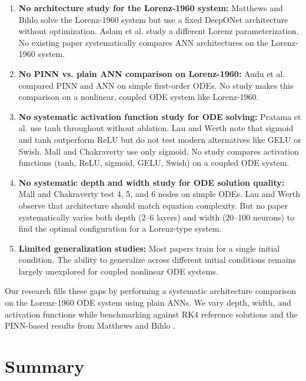 \begin{enumerate}
    \item \textbf{No architecture study for the Lorenz-1960 system:} Matthews and Bihlo \cite{matthews2024pinnde} solve the Lorenz-1960 system but use a fixed DeepONet architecture without optimization. Aslam et al. \cite{aslam2024neuro} study a different Lorenz parameterization. No existing paper systematically compares ANN architectures on the Lorenz-1960 system.

    \item \textbf{No PINN vs. plain ANN comparison on Lorenz-1960:} Audu et al. \cite{audu2026neural} compared PINN and ANN on simple first-order ODEs. No study makes this comparison on a nonlinear, coupled ODE system like Lorenz-1960.

    \item \textbf{No systematic activation function study for ODE solving:} Pratama et al. \cite{pratama2022ann} use tanh throughout without ablation. Lau and Werth \cite{lau2020oden} note that sigmoid and tanh outperform ReLU but do not test modern alternatives like GELU or Swish. Mall and Chakraverty \cite{mall2013comparison} use only sigmoid. No study compares activation functions (tanh, ReLU, sigmoid, GELU, Swish) on a coupled ODE system.

    \item \textbf{No systematic depth and width study for ODE solution quality:} Mall and Chakraverty \cite{mall2013comparison} test 4, 5, and 6 nodes on simple ODEs. Lau and Werth \cite{lau2020oden} observe that architecture should match equation complexity. But no paper systematically varies both depth (2--6 layers) and width (20--100 neurons) to find the optimal configuration for a Lorenz-type system.

    \item \textbf{Limited generalization studies:} Most papers train for a single initial condition. The ability to generalize across different initial conditions remains largely unexplored for coupled nonlinear ODE systems.
\end{enumerate}

Our research fills these gaps by performing a systematic architecture comparison on the Lorenz-1960 ODE system using plain ANNs. We vary depth, width, and activation functions while benchmarking against RK4 reference solutions and the PINN-based results from Matthews and Bihlo \cite{matthews2024pinnde}.


\section{Summary}

